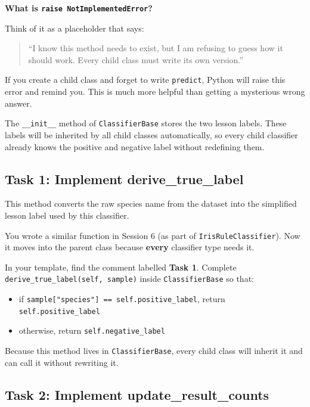 \noindent
\textbf{What is \texttt{raise NotImplementedError}?}

\medskip
\noindent
Think of it as a placeholder that says:
\begin{quote}
``I know this method needs to exist, but I am refusing to guess how it should work.
Every child class must write its own version.''
\end{quote}

\noindent
If you create a child class and forget to write \texttt{predict}, Python will raise this error and remind you.
This is much more helpful than getting a mysterious wrong answer.

\medskip
\noindent
The \texttt{\_\_init\_\_} method of \texttt{ClassifierBase} stores the two lesson labels.
These labels will be inherited by all child classes automatically, so every child classifier already knows the positive and negative label without redefining them.

\subsection{Task 1: Implement derive\_true\_label}

\begin{tcolorbox}[title=Task 1: Implement derive\_true\_label]
This method converts the raw species name from the dataset into the simplified lesson label used by this classifier.

\medskip
\noindent
You wrote a similar function in Session 6 (as part of \texttt{IrisRuleClassifier}).
Now it moves into the parent class because \textbf{every} classifier type needs it.

\medskip
\noindent
In your template, find the comment labelled \textbf{Task 1}.
Complete \texttt{derive\_true\_label(self, sample)} inside \texttt{ClassifierBase} so that:
\begin{itemize}\setlength{\itemsep}{2pt}
    \item if \texttt{sample["species"] == self.positive\_label}, return \texttt{self.positive\_label}
    \item otherwise, return \texttt{self.negative\_label}
\end{itemize}
\end{tcolorbox}

\noindent
Because this method lives in \texttt{ClassifierBase}, every child class will inherit it and can call it without rewriting it.

\subsection{Task 2: Implement update\_result\_counts}


